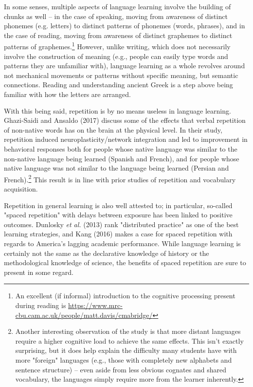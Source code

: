 \documentclass[11pt]{article}
\begin{document}
In some senses, multiple aspects of language learning involve the building of chunks as well -- in the case of speaking, moving from awareness of distinct phonemes (e.g. letters) to distinct patterns of phonemes (words, phrases), and in the case of reading, moving from awareness of distinct graphemes to distinct patterns of graphemes.\footnote{An excellent (if informal) introduction to the cognitive processing present during reading is \url{https://www.mrc-cbu.cam.ac.uk/people/matt.davis/cmabridge/}} However, unlike writing, which does not necessarily involve the construction of meaning (e.g., people can easily type words and patterns they are unfamiliar with), language learning as a whole revolves around not mechanical movements or patterns without specific meaning, but semantic connections. Reading and understanding ancient Greek is a step above being familiar with how the letters are arranged.

With this being said, repetition is by no means useless in language learning. Ghazi-Saidi and Ansaldo (2017) discuss some of the effects that verbal repetition of non-native words has on the brain at the physical level. In their study, repetition induced neuroplasticity/network integration and led to improvement in behavioral responses both for people whose native language was similar to the non-native language being learned (Spanish and French), and for people whose native language was not similar to the language being learned (Persian and French).\footnote{Another interesting observation of the study is that more distant languages require a higher cognitive load to achieve the same effects. This isn't exactly surprising, but it does help explain the difficulty many students have with more "foreign" languages (e.g., those with completely new alphabets and sentence structure) -- even aside from less obvious cognates and shared vocabulary, the languages simply require more from the learner inherently.} This result is in line with prior studies of repetition and vocabulary acquisition.

Repetition in general learning is also well attested to; in particular, so-called "spaced repetition" with delays between exposure has been linked to positive outcomes. Dunlosky \emph{et al.} (2013) rank "distributed practice" as one of the best learning strategies, and Kang (2016) makes a case for spaced repetition with regards to America's lagging academic performance. While language learning is certainly not the same as the declarative knowledge of history or the methodological knowledge of science, the benefits of spaced repetition are sure to present in some regard.
\end{document}
